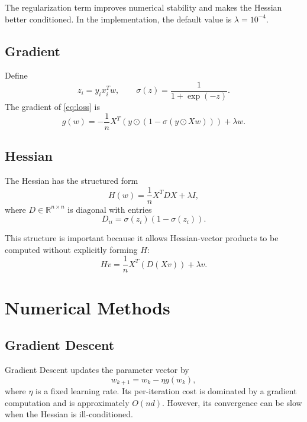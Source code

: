 \documentclass[12pt,a4paper]{report}
\begin{document}
The regularization term improves numerical stability and makes the Hessian better conditioned. In the implementation, the default value is \(\lambda=10^{-4}\).

\section{Gradient}

Define
\begin{equation}
    z_i = y_i x_i^T w,
    \qquad
    \sigma(z)=\frac{1}{1+\exp(-z)}.
\end{equation}
The gradient of \eqref{eq:loss} is
\begin{equation}
    g(w)
    =
    -\frac{1}{n}X^T\left(y\odot(1-\sigma(y\odot Xw))\right)
    +
    \lambda w.
    \label{eq:gradient}
\end{equation}

\section{Hessian}

The Hessian has the structured form
\begin{equation}
    H(w)
    =
    \frac{1}{n}X^T D X+\lambda I,
    \label{eq:hessian}
\end{equation}
where \(D\in\mathbb{R}^{n\times n}\) is diagonal with entries
\begin{equation}
    D_{ii}
    =
    \sigma(z_i)(1-\sigma(z_i)).
\end{equation}

This structure is important because it allows Hessian-vector products to be computed without explicitly forming \(H\):
\begin{equation}
    Hv
    =
    \frac{1}{n}X^T(D(Xv))+\lambda v.
    \label{eq:hvp}
\end{equation}

\chapter{Numerical Methods}

\section{Gradient Descent}

Gradient Descent updates the parameter vector by
\begin{equation}
    w_{k+1}=w_k-\eta g(w_k),
\end{equation}
where \(\eta\) is a fixed learning rate. Its per-iteration cost is dominated by a gradient computation and is approximately \(O(nd)\). However, its convergence can be slow when the Hessian is ill-conditioned.
\end{document}
